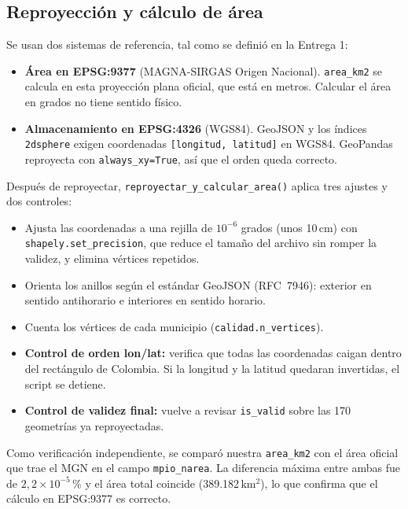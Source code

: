 \documentclass[11pt,a4paper]{article}
\newcommand{\campo}[1]{\texttt{#1}}
\begin{document}
\subsection{Reproyección y cálculo de área}
\label{sec:geometria-reproyeccion}

Se usan dos sistemas de referencia, tal como se definió en la Entrega 1:

\begin{itemize}
  \item \textbf{Área en EPSG:9377} (MAGNA-SIRGAS Origen Nacional).
        \campo{area\_km2} se calcula en esta proyección plana oficial, que
        está en metros. Calcular el área en grados no tiene sentido físico.
  \item \textbf{Almacenamiento en EPSG:4326} (WGS84). GeoJSON y los índices
        \campo{2dsphere} exigen coordenadas \campo{[longitud, latitud]} en
        WGS84. GeoPandas reproyecta con \campo{always\_xy=True}, así que el
        orden queda correcto.
\end{itemize}

Después de reproyectar, \campo{reproyectar\_y\_calcular\_area()} aplica tres
ajustes y dos controles:

\begin{itemize}
  \item Ajusta las coordenadas a una rejilla de $10^{-6}$ grados (unos
        10\,cm) con \campo{shapely.set\_precision}, que reduce el tamaño del
        archivo sin romper la validez, y elimina vértices repetidos.
  \item Orienta los anillos según el estándar GeoJSON (RFC~7946): exterior
        en sentido antihorario e interiores en sentido horario.
  \item Cuenta los vértices de cada municipio (\campo{calidad.n\_vertices}).
  \item \textbf{Control de orden lon/lat:} verifica que todas las
        coordenadas caigan dentro del rectángulo de Colombia. Si la longitud
        y la latitud quedaran invertidas, el script se detiene.
  \item \textbf{Control de validez final:} vuelve a revisar
        \campo{is\_valid} sobre las 170 geometrías ya reproyectadas.
\end{itemize}

Como verificación independiente, se comparó nuestra \campo{area\_km2} con
el área oficial que trae el MGN en el campo \campo{mpio\_narea}. La
diferencia máxima entre ambas fue de $2{,}2\times10^{-5}$\,\% y el área total
coincide (389.182\,km$^2$), lo que confirma que el cálculo en EPSG:9377 es
correcto.
\end{document}
